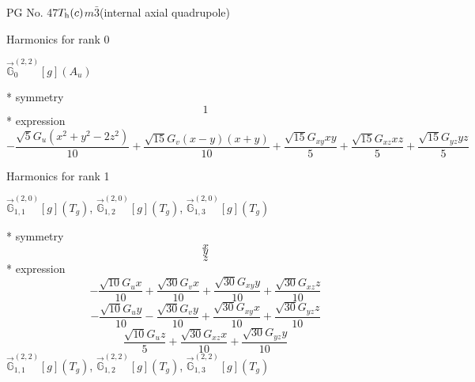 \documentclass[fleqn,8pt]{jsarticle}
\begin{document}
\setcounter{MaxMatrixCols}{32}

\renewcommand{\tablename}{Table~}
\renewcommand{\figurename}{Figure~}
\begin{center}
\LARGE
PG No. 47\quad$T_{\rm h}(c)$\quad$m\bar{3}$\quad[ cubic ] (internal axial quadrupole)
\end{center}

\noindent * Harmonics for rank 0

\noindent\quad $\vec{\mathbb{G}}_{0}^{(2,2)}[g](A_{u})$

\noindent\quad ** symmetry
\begin{dmath*}
1
\end{dmath*}
\noindent\quad ** expression
\begin{dmath*}
- \frac{\sqrt{5} G_{u} \left(x^{2} + y^{2} - 2 z^{2}\right)}{10} + \frac{\sqrt{15} G_{v} \left(x - y\right) \left(x + y\right)}{10} + \frac{\sqrt{15} G_{xy} x y}{5} + \frac{\sqrt{15} G_{xz} x z}{5} + \frac{\sqrt{15} G_{yz} y z}{5}
\end{dmath*}

\noindent * Harmonics for rank 1

\noindent\quad $\vec{\mathbb{G}}_{1,1}^{(2,0)}[g](T_{g})$, $\vec{\mathbb{G}}_{1,2}^{(2,0)}[g](T_{g})$, $\vec{\mathbb{G}}_{1,3}^{(2,0)}[g](T_{g})$

\noindent\quad ** symmetry
\begin{dmath*}
x
\end{dmath*}
\begin{dmath*}
y
\end{dmath*}
\begin{dmath*}
z
\end{dmath*}
\noindent\quad ** expression
\begin{dmath*}
- \frac{\sqrt{10} G_{u} x}{10} + \frac{\sqrt{30} G_{v} x}{10} + \frac{\sqrt{30} G_{xy} y}{10} + \frac{\sqrt{30} G_{xz} z}{10}
\end{dmath*}
\begin{dmath*}
- \frac{\sqrt{10} G_{u} y}{10} - \frac{\sqrt{30} G_{v} y}{10} + \frac{\sqrt{30} G_{xy} x}{10} + \frac{\sqrt{30} G_{yz} z}{10}
\end{dmath*}
\begin{dmath*}
\frac{\sqrt{10} G_{u} z}{5} + \frac{\sqrt{30} G_{xz} x}{10} + \frac{\sqrt{30} G_{yz} y}{10}
\end{dmath*}
\noindent\quad $\vec{\mathbb{G}}_{1,1}^{(2,2)}[g](T_{g})$, $\vec{\mathbb{G}}_{1,2}^{(2,2)}[g](T_{g})$, $\vec{\mathbb{G}}_{1,3}^{(2,2)}[g](T_{g})$
\end{document}
